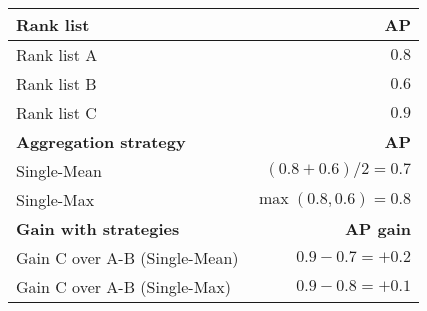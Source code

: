 \begin{example}
\begin{subexample}{\linewidth}
    \begin{tabular}{l r}
      \toprule
      \textbf{Rank list} & \textbf{AP} \\
      \midrule
      Rank list A & $0.8$ \\
      Rank list B & $0.6$ \\
      Rank list C & $0.9$ \\
      \midrule
      \textbf{Aggregation strategy} & \textbf{AP} \\
      Single-Mean & $(0.8 + 0.6) / 2 = 0.7$ \\
      Single-Max & $\max(0.8, 0.6) = 0.8$ \\
      \midrule
      \textbf{Gain with strategies} & \textbf{AP gain} \\
      Gain C over A-B (Single-Mean) & $0.9 - 0.7 = +0.2$ \\
      Gain C over A-B (Single-Max) & $0.9 - 0.8 = +0.1$ \\
      \bottomrule
    \end{tabular}
  \end{subexample}

\end{example}
